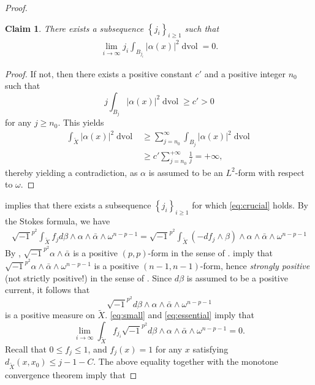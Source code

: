 \documentclass[11pt,a4paper,english]{smfart}
\theoremstyle{plain}
\newtheorem{claim}[theorem]{Claim}
\theoremstyle{definition}
\theoremstyle{plain}
\DeclareMathOperator{\dvol}{dvol}
\begin{document}
\begin{proof}
		\begin{claim}\label{claim:converge}
			There exists a subsequence $\left\{j_i\right\}_{i \geq 1}$ such that
			\begin{align}\label{eq:crucial}
				\lim _{i \rightarrow \infty} j_i  \int_{B_{j_i}}|\alpha(x)|^2 \dvol=0 .
			\end{align}  
		\end{claim}	 
		\begin{proof}
			If not, then there exists a positive constant $c'$ and a positive integer $n_0$ such that 
			$$
		j\int_{B_{j} }|\alpha(x)|^2 \dvol \geq c'>0
			$$
			for any $j\geq n_0$.
			This yields
			$$
			\begin{aligned}
			 \int_{\widetilde{X}}|\alpha(x)|^2 \dvol & \geq \sum_{j=n_0}^{\infty} \int_{B_{j}}  |\alpha(x)|^2 \dvol \\
				& \geq c' \sum_{j=n_0}^{+\infty} \frac{1}{j}=+\infty,
			\end{aligned}
			$$
		thereby yielding a contradiction, as $\alpha$ is assumed to be an $L^2$-form with respect to $\omega$.
		\end{proof}	
			 implies that there exists a subsequence $\left\{j_i\right\}_{i \geq 1}$ for which \eqref{eq:crucial} holds.  By the Stokes formula, we have
		\begin{align}\label{eq:essential} 
			\sqrt{-1}^{p^2}	\int_{\widetilde{X} } f_j  d\beta \wedge \alpha\wedge \bar{\alpha}\wedge \omega^{n-p-1}
			= \sqrt{-1}^{p^2}	\int_{\widetilde{X} }  (-df_j\wedge \beta)\wedge\alpha\wedge \bar{\alpha}\wedge \omega^{n-p-1}    
		\end{align} 
	 	By \cite[Chapter III, Example 1.2]{Dembook}, $\sqrt{-1}^{p^2}	  \alpha\wedge \bar{\alpha}$ is a positive $(p,p)$-form in the sense of \cite[Chapter III, Definition 1.1]{Dembook}. 	 \cite[Chapter III, Corollary 1.9 \& Proposition 1.11]{Dembook} imply that $\sqrt{-1}^{p^2}\alpha\wedge \bar{\alpha}\wedge \omega^{n-p-1}$ is a positive $(n-1,n-1)$-form, hence \emph{strongly positive} (not strictly positive!) in the sense of  \cite[Chapter III, Definition 1.1]{Dembook}. 	  Since $d\beta$ is assumed to be a positive current, it follows that
		 $$
 	\sqrt{-1}^{p^2}	   d\beta \wedge \alpha\wedge \bar{\alpha}\wedge \omega^{n-p-1}
		 $$
		 is a  positive measure on $\widetilde{X}$.   \eqref{eq:small}    and \eqref{eq:essential}   imply that
		 $$ 
	\lim\limits_{i\to\infty}	\int_{\widetilde{X} } f_{j_i}	\sqrt{-1}^{p^2}	 d\beta \wedge \alpha\wedge \bar{\alpha}\wedge \omega^{n-p-1}=0.
		 $$ 
Recall that $0 \leq f_j \leq 1$,  and $ f_j(x) =1$ for any $x$ satisfying  $d_{\widetilde{X}}(x,x_0)\leq j-1-C$. The above equality together with the monotone convergence theorem imply that 

\end{proof}
\end{document}
